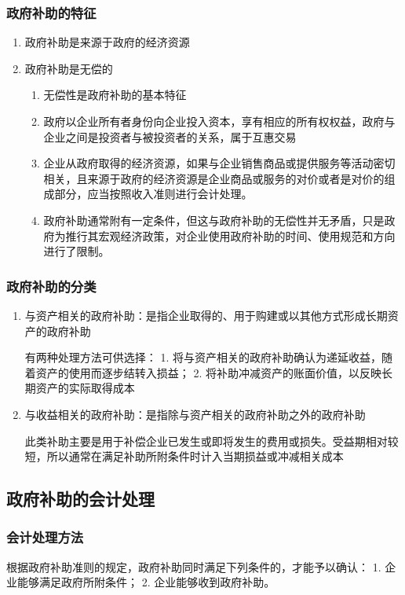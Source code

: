 \documentclass[UTF8,12pt]{ctexart}
\numberwithin{equation}{section} %
\numberwithin{figure}{section}
\numberwithin{table}{section}
\begin{document}
	\subsubsection{政府补助的特征}
	\begin{enumerate}
		\item 政府补助是来源于政府的经济资源
		
		\item 政府补助是无偿的
		\begin{enumerate}
			\item 无偿性是政府补助的基本特征
			
			\item 政府以企业所有者身份向企业投入资本，享有相应的所有权权益，政府与企业之间是投资者与被投资者的关系，属于互惠交易
			
			\item 企业从政府取得的经济资源，如果与企业销售商品或提供服务等活动密切相关，且来源于政府的经济资源是企业商品或服务的对价或者是对价的组成部分，应当按照收入准则进行会计处理。
			
			\item 政府补助通常附有一定条件，但这与政府补助的无偿性并无矛盾，只是政府为推行其宏观经济政策，对企业使用政府补助的时间、使用规范和方向进行了限制。
		\end{enumerate}
	\end{enumerate}
	\subsubsection{政府补助的分类}
	\begin{enumerate}
		\item 与资产相关的政府补助：是指企业取得的、用于购建或以其他方式形成长期资产的政府补助
		
		有两种处理方法可供选择：
		1.	将与资产相关的政府补助确认为递延收益，随着资产的使用而逐步结转入损益；
		2.	将补助冲减资产的账面价值，以反映长期资产的实际取得成本
		
		
		\item 与收益相关的政府补助：是指除与资产相关的政府补助之外的政府补助
		
		此类补助主要是用于补偿企业已发生或即将发生的费用或损失。受益期相对较短，所以通常在满足补助所附条件时计入当期损益或冲减相关成本
	\end{enumerate}
	
	\subsection{政府补助的会计处理}
	\subsubsection{会计处理方法}
	根据政府补助准则的规定，政府补助同时满足下列条件的，才能予以确认：
	1.	企业能够满足政府所附条件；
	2.	企业能够收到政府补助。
	
\end{document}
